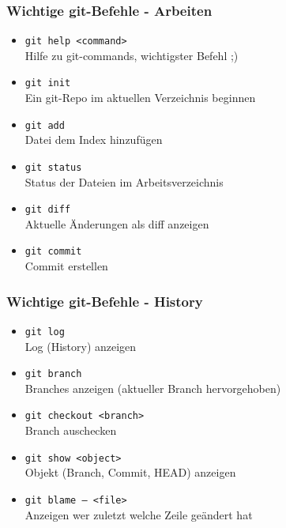 \begin{frame}
  \frametitle{Wichtige git-Befehle - Arbeiten}
  \begin{itemize}
    \item {\tt git help <command>} \\ Hilfe zu git-commands, wichtigster Befehl ;)
    \item {\tt git init} \\ Ein git-Repo im aktuellen Verzeichnis beginnen
    \item {\tt git add} \\ Datei dem Index hinzufügen
    \item {\tt git status} \\ Status der Dateien im Arbeitsverzeichnis
    \item {\tt git diff} \\ Aktuelle Änderungen als diff anzeigen
    \item {\tt git commit} \\ Commit erstellen
  \end{itemize}
\end{frame}

\begin{frame}
  \frametitle{Wichtige git-Befehle - History}
  \begin{itemize}
    \item {\tt git log} \\ Log (History) anzeigen
    \item {\tt git branch} \\ Branches anzeigen (aktueller Branch hervorgehoben)
    \item {\tt git checkout <branch>} \\ Branch auschecken
    \item {\tt git show <object>} \\ Objekt (Branch, Commit, HEAD) anzeigen
    \item {\tt git blame -- <file>} \\ Anzeigen wer zuletzt welche Zeile geändert hat
  \end{itemize}
\end{frame}

